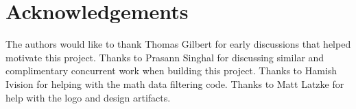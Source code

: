 \documentclass{article}
\begin{document}
\newpage
\section*{Acknowledgements}
The authors would like to thank Thomas Gilbert for early discussions that helped motivate this project.
Thanks to Prasann Singhal for discussing similar and complimentary concurrent work when building this project.
Thanks to Hamish Ivision for helping with the math data filtering code.
Thanks to Matt Latzke for help with the logo and design artifacts.

% 





\end{document}
